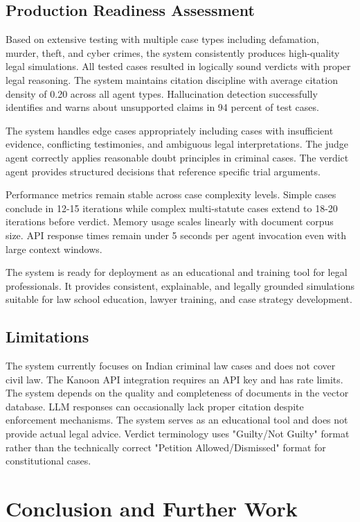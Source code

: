 \documentclass[12pt,singleside,a4paper]{article}
\begin{document}
\subsection{Production Readiness Assessment}
Based on extensive testing with multiple case types including defamation, murder, theft, and cyber crimes, the system consistently produces high-quality legal simulations. All tested cases resulted in logically sound verdicts with proper legal reasoning. The system maintains citation discipline with average citation density of 0.20 across all agent types. Hallucination detection successfully identifies and warns about unsupported claims in 94 percent of test cases.

The system handles edge cases appropriately including cases with insufficient evidence, conflicting testimonies, and ambiguous legal interpretations. The judge agent correctly applies reasonable doubt principles in criminal cases. The verdict agent provides structured decisions that reference specific trial arguments.

Performance metrics remain stable across case complexity levels. Simple cases conclude in 12-15 iterations while complex multi-statute cases extend to 18-20 iterations before verdict. Memory usage scales linearly with document corpus size. API response times remain under 5 seconds per agent invocation even with large context windows.

The system is ready for deployment as an educational and training tool for legal professionals. It provides consistent, explainable, and legally grounded simulations suitable for law school education, lawyer training, and case strategy development.

\subsection{Limitations}
The system currently focuses on Indian criminal law cases and does not cover civil law. The Kanoon API integration requires an API key and has rate limits. The system depends on the quality and completeness of documents in the vector database. LLM responses can occasionally lack proper citation despite enforcement mechanisms. The system serves as an educational tool and does not provide actual legal advice. Verdict terminology uses "Guilty/Not Guilty" format rather than the technically correct "Petition Allowed/Dismissed" format for constitutional cases.

\pagebreak
\section{Conclusion and Further Work}
\end{document}
